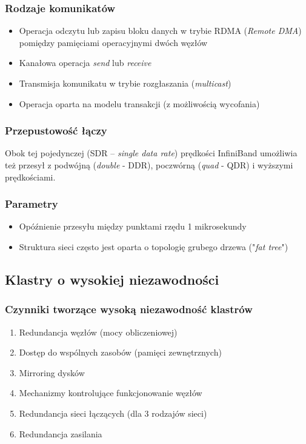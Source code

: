 		\subsubsection{Rodzaje komunikatów}
			\begin{itemize}
				\item Operacja odczytu lub zapisu bloku danych w trybie RDMA (\emph{Remote DMA}) pomiędzy pamięciami operacyjnymi dwóch węzłów
				\item Kanałowa operacja \emph{send} lub \emph{receive}
				\item Transmisja komunikatu w trybie rozgłaszania (\emph{multicast})
				\item Operacja oparta na modelu transakcji (z możliwością wycofania)
			\end{itemize}
		\subsubsection{Przepustowość łączy}
			Obok tej pojedynczej (SDR – \emph{single data rate}) prędkości InfiniBand umożliwia też przesył z podwójną (\emph{double} - DDR), poczwórną (\emph{quad} - QDR) i wyższymi prędkościami.
		\subsubsection{Parametry}
			\begin{itemize}
				\item Opóźnienie przesyłu między punktami rzędu 1 mikrosekundy
				\item Struktura sieci często jest oparta o topologię grubego drzewa ("\emph{fat tree}")
			\end{itemize}
	\subsection{Klastry o wysokiej niezawodności} \label{subsec:niezawodnoscKlastrow}
		\subsubsection{Czynniki tworzące wysoką niezawodność klastrów}
			\begin{enumerate}
				\item Redundancja węzłów (mocy obliczeniowej)
				\item Dostęp do wspólnych zasobów (pamięci zewnętrznych)
				\item Mirroring dysków
				\item Mechanizmy kontrolujące funkcjonowanie węzłów
				\item Redundancja sieci łączących (dla 3 rodzajów sieci)
				\item Redundancja zasilania
			\end{enumerate}
